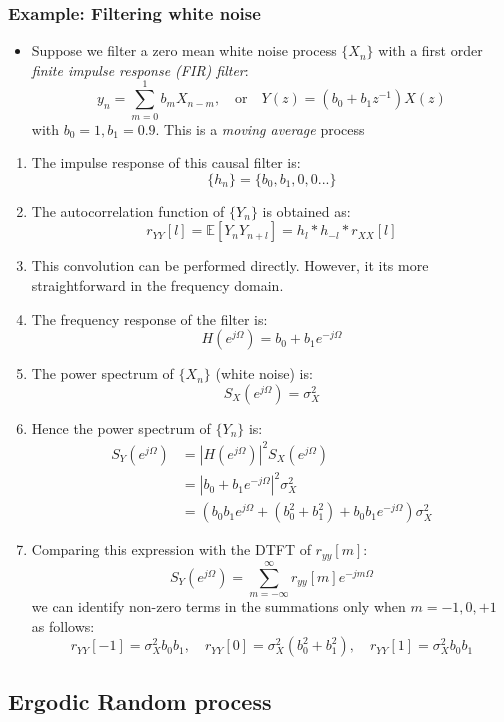 \documentclass[12pt]{article}
\newcommand{\titc}[1]{\textit{\textcolor{blue1}{#1}}}
\newcommand{\sigd}{\sigma^2}
\newcommand{\mexp}{\mathbb{E}}
\newcommand{\summ}[2]{\sum_{#1}^{#2}}
\newcommand{\summinfinf}{\summ{m=-\infty}{\infty}}
\newcommand{\proc}[1]{\{ #1_n\}}
\newcommand{\ps}{S_X}
\newcommand{\autocoy}{r_{yy}}
\begin{document}
\subsubsection{Example: Filtering white noise}
\begin{itemize}
    \item Suppose we filter a zero mean white noise process $\proc{X}$ with a first order \titc{finite impulse response (FIR) filter}:
    \[
    y_n = \sum_{m=0}^1 b_m X_{n-m}, \quad \textrm{or} \quad Y(z) = (b_0 + b_1 z^{-1})X(z) 
    \]
    with $b_0 = 1, b_1 = 0.9$. This is a \titc{moving average} process
    \end{itemize}
    \begin{enumerate}
    \item The impulse response of this causal filter is:
    \[
    \{ h_n\} = \{ b_0,b_1,0,0... \}
    \]
    \item The autocorrelation function of $\proc{Y}$ is obtained as:
    \[
    r_{YY}[l] = \mexp[Y_n Y_{n+l}] = h_l * h_{-l} * r_{XX}[l]
    \]
    \item This convolution can be performed directly. However, it its more straightforward in the frequency domain.
    \item The frequency response of the filter is:
    \[
    H(e^{j\Omega}) = b_0 + b_1 e^{{-j\Omega}}
    \]
    \item The power spectrum of $\{X_n \}$ (white noise) is:
    \[
    \ps(e^{j\Omega}) = \sigd_X
    \]
    \item Hence the power spectrum of $\{ Y_n\}$ is:
    \begin{align*}
        S_Y(e^{j\Omega}) &= |H(e^{j\Omega})|^2\ps(e^{j\Omega}) \\
        &= |b_0 + b_1e^{-j\Omega}|^2 \sigd_X \\
        & = (b_0 b_1 e^{j\Omega} + (b_0^2 + b_1^2) + b_0 b_1 e^{-j\Omega})\sigd_X
    \end{align*}
    \item Comparing this expression with the DTFT of $\autocoy[m]$:
    \[
    S_{Y}(e^{j\Omega}) = \summinfinf \autocoy[m]e^{-jm\Omega}
    \]
    we can identify non-zero terms in the summations only when $m=-1,0,+1$ as follows: 
    \[
    r_{YY}[-1] = \sigd_X b_0 b_1,\quad r_{YY}[0] =\sigd_X (b_0^2 + b_1^2), \quad r_{YY}[1] = \sigd_X b_0 b_1
    \]
    
\end{enumerate}
\subsection{Ergodic Random process}
\end{document}
